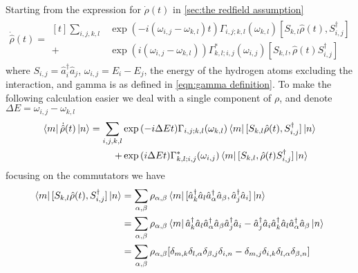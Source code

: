 Starting from the
expression for \(\dot{\rho}(t)\)
in \cref{sec:the redfield assumption}
\begin{align}
  \dot{\hat{\rho}}(t) = \begin{aligned}[t]
    \sum_{i,j,k, l} &
    \exp{(-i(\omega_{i,j}-\omega_{k,l})t)}
    \Gamma_{i,j;k, l}(\omega_{k,l})
    [S_{k, l}\hat{\rho}(t),
    S^\dagger_{i,j}]                                       \\
    +               & \exp{(i(\omega_{i,j}-\omega_{k,l}))}
    \Gamma^*_{k, l; i,j}(\omega_{i,j})
    [S_{k, l},
      \hat{\rho}(t) S^\dagger_{i,j}]
  \end{aligned}
\end{align}
where \(S_{i,j}= \hat{a}^\dagger_i \hat{a}_j\),
\(\omega_{i,j} = E_i - E_j\), the energy of
the hydrogen atoms excluding the interaction, and
gamma is as defined in
\cref{eqn:gamma definition}. To
make the following calculation easier we deal
with a single component of \(\rho \), and
denote \(\Delta{}E = \omega_{i,j}-\omega_{k,l}\)
\begin{align}
  \bra{m}\dot{\hat{\rho}}(t) \ket{n} = \begin{aligned}[t]
    \sum_{i,j,k, l} &
    \exp{(-i\Delta{}Et)}
    \Gamma_{i,j;k, l}(\omega_{k,l})
    \bra{m}[S_{k, l}\hat{\rho}(t),
    S^\dagger_{i,j}] \ket{n}               \\
    +               & \exp{(i\Delta{}E t)}
    \Gamma^*_{k, l; i,j}(\omega_{i,j})
    \bra{m}[S_{k, l},
      \hat{\rho}(t) S^\dagger_{i,j}]\ket{n}
  \end{aligned}
\end{align}
focusing on the commutators we have
\begin{align}
  \bra{m}[S_{k, l}\hat{\rho}(t),
  S^\dagger_{i, j}] \ket{n} & =
  \sum_{\alpha, \beta} \rho_{\alpha, \beta}\bra{m}
  [\hat{a}^\dagger_k \hat{a}_l
    \hat{a}^\dagger_\alpha \hat{a}_\beta,
    \hat{a}^\dagger_j \hat{a}_i]
  \ket{n}                       \\
                            & =
  \sum_{\alpha, \beta} \rho_{\alpha, \beta}\bra{m}
  \hat{a}^\dagger_k \hat{a}_l
  \hat{a}^\dagger_\alpha \hat{a}_\beta
  \hat{a}^\dagger_j \hat{a}_i
  -
  \hat{a}^\dagger_j \hat{a}_i
  \hat{a}^\dagger_k \hat{a}_l
  \hat{a}^\dagger_\alpha \hat{a}_\beta
  \ket{n}                       \\
                            & =
  \sum_{\alpha, \beta} \rho_{\alpha, \beta} [
    \delta_{m, k}\delta_{l, \alpha}
    \delta_{\beta, j}\delta_{i, n}
    -\delta_{m, j}\delta_{i, k}
    \delta_{l, \alpha}\delta_{\beta, n}]
\end{align}
